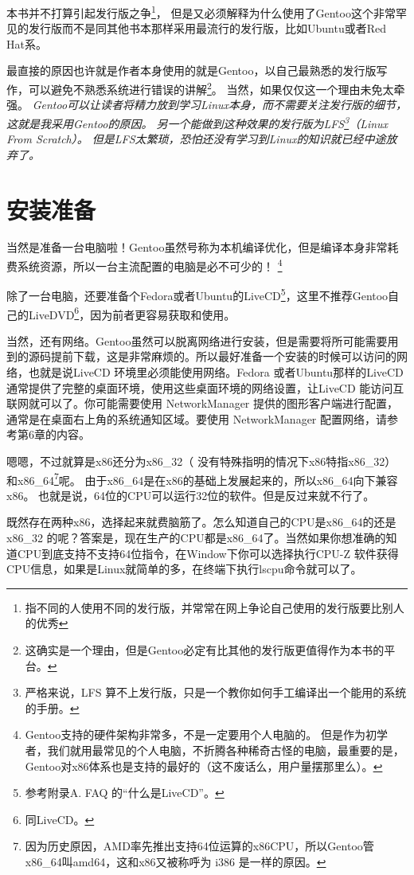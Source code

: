 \documentclass[amstex,twoside]{ctexbook}
\begin{document}
本书并不打算引起发行版之争\footnote{指不同的人使用不同的发行版，并常常在网上争论自己使用的发行版要比别人的优秀}，
但是又必须解释为什么使用了Gentoo这个非常罕见的发行版而不是同其他书本那样采用最流行的发行版，比如Ubuntu或者Red Hat系。

最直接的原因也许就是作者本身使用的就是Gentoo，以自己最熟悉的发行版写作，可以避免不熟悉系统进行错误的讲解\footnote{这确实是一个理由，但是Gentoo必定有比其他的发行版更值得作为本书的平台。}。
当然，如果仅仅这一个理由未免太牵强。
\it
Gentoo可以让读者将精力放到学习Linux本身，而不需要关注发行版的细节，这就是我采用Gentoo的原因。
\normalfont
另一个能做到这种效果的发行版为LFS\footnote{严格来说，LFS 算不上发行版，只是一个教你如何手工编译出一个能用的系统的手册。}（Linux From Scratch）。
但是LFS太繁琐，恐怕还没有学习到Linux的知识就已经中途放弃了。


\section{安装准备}

当然是准备一台电脑啦！Gentoo虽然号称为本机编译优化，但是编译本身非常耗费系统资源，所以一台主流配置的电脑是必不可少的！
\footnote{Gentoo支持的硬件架构非常多，不是一定要用个人电脑的。
但是作为初学者，我们就用最常见的个人电脑，不折腾各种稀奇古怪的电脑，最重要的是，Gentoo对x86体系也是支持的最好的（这不废话么，用户量摆那里么）。}


除了一台电脑，还要准备个Fedora或者Ubuntu的LiveCD\footnote{参考附录A. FAQ 的“什么是LiveCD”。
}，这里不推荐Gentoo自己的LiveDVD\footnote{同LiveCD。}，因为前者更容易获取和使用。

当然，还有网络。Gentoo虽然可以脱离网络进行安装，但是需要将所可能需要用到的源码提前下载，这是非常麻烦的。所以最好准备一个安装的时候可以访问的网络，也就是说LiveCD 环境里必须能使用网络。Fedora 或者Ubuntu那样的LiveCD 通常提供了完整的桌面环境，使用这些桌面环境的网络设置，让LiveCD 能访问互联网就可以了。你可能需要使用 NetworkManager 提供的图形客户端进行配置，通常是在桌面右上角的系统通知区域。要使用 NetworkManager 配置网络，请参考第6章的内容。

嗯嗯，不过就算是x86还分为x86\_32（ 没有特殊指明的情况下x86特指x86\_32） 和x86\_64\footnote{因为历史原因，AMD率先推出支持64位运算的x86CPU，所以Gentoo管x86\_64叫amd64，这和x86又被称呼为 i386 是一样的原因。}呢。
由于x86\_64是在x86的基础上发展起来的，所以x86\_64向下兼容x86。 也就是说，64位的CPU可以运行32位的软件。但是反过来就不行了。

既然存在两种x86，选择起来就费脑筋了。怎么知道自己的CPU是x86\_64的还是x86\_32 的呢？答案是，现在生产的CPU都是x86\_64了。当然如果你想准确的知道CPU到底支持不支持64位指令，在Window下你可以选择执行CPU-Z 软件获得CPU信息，如果是Linux就简单的多，在终端下执行lscpu命令就可以了。
\end{document}
